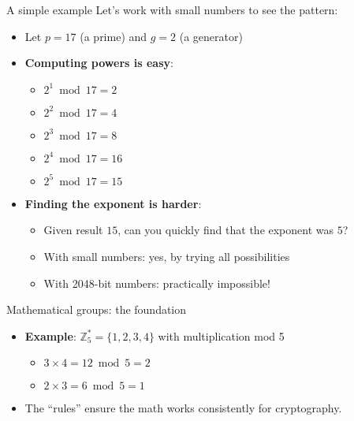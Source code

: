 \documentclass[aspectratio=169, lualatex, handout]{beamer}
\begin{document}
\begin{frame}{A simple example}
	Let's work with small numbers to see the pattern:
	\vspace{0.5cm}
	\begin{itemize}[<+->]
		\item Let $p = 17$ (a prime) and $g = 2$ (a generator)
		\item \textbf{Computing powers is easy}:
		      \begin{itemize}
			      \item $2^1 \bmod 17 = 2$
			      \item $2^2 \bmod 17 = 4$
			      \item $2^3 \bmod 17 = 8$
			      \item $2^4 \bmod 17 = 16$
			      \item $2^5 \bmod 17 = 15$
		      \end{itemize}
		\item \textbf{Finding the exponent is harder}:
		      \begin{itemize}
			      \item Given result $15$, can you quickly find that the exponent was $5$?
			      \item With small numbers: yes, by trying all possibilities
			      \item With 2048-bit numbers: practically impossible!
		      \end{itemize}
	\end{itemize}
\end{frame}

\begin{frame}{Mathematical groups: the foundation}
	\begin{itemize}[<+->]
		\item \textbf{Example}: $\mathbb{Z}_5^* = \{1, 2, 3, 4\}$ with multiplication mod 5
		      \begin{itemize}
			      \item $3 \times 4 = 12 \bmod 5 = 2$
			      \item $2 \times 3 = 6 \bmod 5 = 1$
		      \end{itemize}
		\item The ``rules'' ensure the math works consistently for cryptography.
	\end{itemize}
\end{frame}
\end{document}
